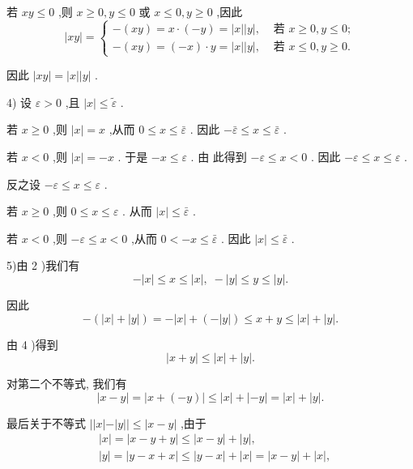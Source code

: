 若 ${xy} \leq  0$ ,则 $x \geq  0,y \leq  0$ 或 $x \leq  0,y \geq  0$ ,因此
$$\left| {xy}\right|  = \left\{  \begin{array}{ll}  - \left( {xy}\right)  = x \cdot  \left( {-y}\right)  = \left| x\right| \left| y\right| , & \text{ 若 }x \geq  0,y \leq  0; \\   - \left( {xy}\right)  = \left( {-x}\right)  \cdot  y = \left| x\right| \left| y\right| , & \text{ 若 }x \leq  0,y \geq  0. \end{array}\right.$$

因此 $\left| {xy}\right|  = \left| x\right| \left| y\right|$ .

4) 设 $\varepsilon  > 0$ ,且 $\left| x\right|  \leq  \widetilde{\varepsilon }$ .

若 $x \geq  0$ ,则 $\left| x\right|  = x$ ,从而 $0 \leq  x \leq  \bar{\varepsilon }$ . 因此 $- \bar{\varepsilon } \leq  x \leq  \bar{\varepsilon }$ .

若 $x < 0$ ,则 $\left| x\right|  =  - x$ . 于是 $- x \leq  \varepsilon$ . 由 此得到 $- \varepsilon  \leq  x < 0$ . 因此 $- \varepsilon  \leq  x \leq  \varepsilon$ .

反之设 $- \varepsilon  \leq  x \leq  \varepsilon$ .

若 $x \geq  0$ ,则 $0 \leq  x \leq  \varepsilon$ . 从而 $\left| x\right|  \leq  \bar{\varepsilon }$ .

若 $x < 0$ ,则 $- \varepsilon  \leq  x < 0$ ,从而 $0 <  - x \leq  \bar{\varepsilon }$ . 因此 $\left| x\right|  \leq  \bar{\varepsilon }$ .

5)由 2 )我们有
$$- \left| x\right|  \leq  x \leq  \left| x\right| ,\; - \left| y\right|  \leq  y \leq  \left| y\right| .$$

因此
$$- \left( {\left| x\right|  + \left| y\right| }\right)  =  - \left| x\right|  + \left( {-\left| y\right| }\right)  \leq  x + y \leq  \left| x\right|  + \left| y\right| .$$

由 4 )得到
$$\left| {x + y}\right|  \leq  \left| x\right|  + \left| y\right| .$$

对第二个不等式, 我们有
$$\left| {x - y}\right|  = \left| {x + \left( {-y}\right) }\right|  \leq  \left| x\right|  + \left| {-y}\right|  = \left| x\right|  + \left| y\right| .$$

最后关于不等式 $\left| \right| x\left| -\right| y\left| \right|  \leq  \left| {x - y}\right|$ ,由于
\begin{align*}
	&\left| x\right|  = \left| {x - y + y}\right|  \leq  \left| {x - y}\right|  + \left| y\right| ,\\
	&\left| y\right|  = \left| {y - x + x}\right|  \leq  \left| {y - x}\right|  + \left| x\right|  = \left| {x - y}\right|  + \left| x\right| ,
\end{align*}

